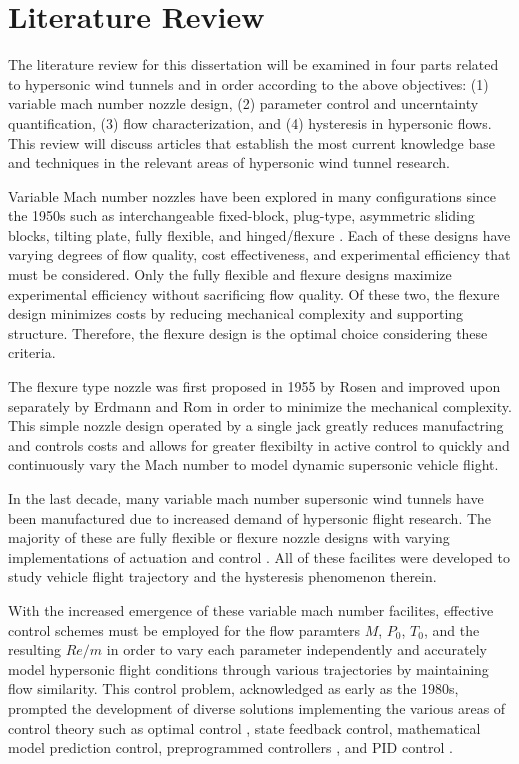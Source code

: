 \section{Literature Review}

The literature review for this dissertation will be examined in four parts related to hypersonic wind tunnels and in order according to the above objectives: (1) variable mach number nozzle design, (2) parameter control and uncerntainty quantification, (3) flow characterization, and (4) hysteresis in hypersonic flows. This review will discuss articles that establish the most current knowledge base and techniques in the relevant areas of hypersonic wind tunnel research.

Variable Mach number nozzles have been explored in many configurations since the 1950s such as interchangeable fixed-block, plug-type, asymmetric sliding blocks, tilting plate, fully flexible, and hinged/flexure \cite{agard-ag-3}. Each of these designs have varying degrees of flow quality, cost effectiveness, and experimental efficiency that must be considered. Only the fully flexible and flexure designs maximize experimental efficiency without sacrificing flow quality. Of these two, the flexure design minimizes costs by reducing mechanical complexity and supporting structure. Therefore, the flexure design is the optimal choice considering these criteria.

The flexure type nozzle was first proposed in 1955 by Rosen \cite{rosen} and improved upon separately by Erdmann and Rom \cite{erdmann,rom} in order to minimize the mechanical complexity. This simple nozzle design operated by a single jack greatly reduces manufactring and controls costs and allows for greater flexibilty in active control to quickly and continuously vary the Mach number to model dynamic supersonic vehicle flight.

In the last decade, many variable mach number supersonic wind tunnels have been manufactured due to increased demand of hypersonic flight research. The majority of these are fully flexible or flexure nozzle designs with varying implementations of actuation and control \cite{durand,laguarda,chen,guo,lv,qi,steeves}. All of these facilites were developed to study vehicle flight trajectory and the hysteresis phenomenon therein.

With the increased emergence of these variable mach number facilites, effective control schemes must be employed for the flow paramters $M$, $P_0$, $T_0$, and the resulting $Re/m$ in order to vary each parameter independently and accurately model hypersonic flight conditions through various trajectories by maintaining flow similarity. This control problem, acknowledged as early as the 1980s, prompted the development of diverse solutions implementing the various areas of control theory such as optimal control \cite{kraft,hwang}, state feedback control, mathematical model prediction control, preprogrammed controllers \cite{matsumoto}, and PID control \cite{fung,ilic-2}.

